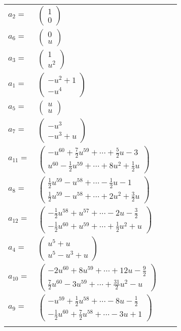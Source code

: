 \documentclass[1p]{elsarticle_modified}
\theoremstyle{definition}
\begin{document}
\begin{tabular}{m{7pt} m{180pt} m{7pt} m{180pt} }
\flushright $a_{2}=$&$\begin{pmatrix}1\\0\end{pmatrix}$ \\
\flushright $a_{6}=$&$\begin{pmatrix}0\\u\end{pmatrix}$ \\
\flushright $a_{3}=$&$\begin{pmatrix}1\\u^2\end{pmatrix}$ \\
\flushright $a_{1}=$&$\begin{pmatrix}- u^2+1\\- u^4\end{pmatrix}$ \\
\flushright $a_{5}=$&$\begin{pmatrix}u\\u\end{pmatrix}$ \\
\flushright $a_{7}=$&$\begin{pmatrix}- u^3\\- u^3+u\end{pmatrix}$ \\
\flushright $a_{11}=$&$\begin{pmatrix}- u^{60}+\frac{7}{2} u^{59}+\cdots+\frac{5}{2} u-3\\u^{60}-\frac{1}{2} u^{59}+\cdots+8 u^2+\frac{1}{2} u\end{pmatrix}$ \\
\flushright $a_{8}=$&$\begin{pmatrix}\frac{1}{2} u^{59}- u^{58}+\cdots-\frac{1}{2} u-1\\\frac{1}{2} u^{59}- u^{58}+\cdots+2 u^2+\frac{3}{2} u\end{pmatrix}$ \\
\flushright $a_{12}=$&$\begin{pmatrix}-\frac{1}{2} u^{58}+u^{57}+\cdots-2 u-\frac{3}{2}\\-\frac{1}{2} u^{60}+u^{59}+\cdots+\frac{1}{2} u^2+u\end{pmatrix}$ \\
\flushright $a_{4}=$&$\begin{pmatrix}u^5+u\\u^5- u^3+u\end{pmatrix}$ \\
\flushright $a_{10}=$&$\begin{pmatrix}-2 u^{60}+8 u^{59}+\cdots+12 u-\frac{9}{2}\\\frac{7}{2} u^{60}-3 u^{59}+\cdots+\frac{31}{2} u^2- u\end{pmatrix}$ \\
\flushright $a_{9}=$&$\begin{pmatrix}- u^{59}+\frac{1}{2} u^{58}+\cdots-8 u-\frac{1}{2}\\-\frac{1}{2} u^{60}+\frac{7}{2} u^{58}+\cdots-3 u+1\end{pmatrix}$\\&\end{tabular}
\end{document}
